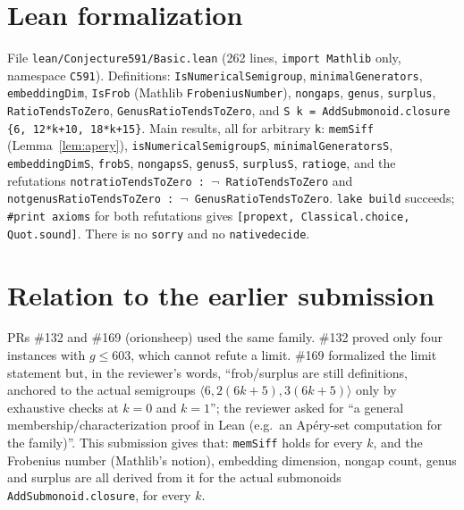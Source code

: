 \documentclass[11pt]{article}
\renewcommand{\_}{\oldus\allowbreak}
\theoremstyle{definition}
\theoremstyle{remark}
\begin{document}
\section{Lean formalization}

File \texttt{lean/Conjecture591/Basic.lean} (262 lines, \texttt{import Mathlib} only, namespace
\texttt{C591}). Definitions: \texttt{IsNumericalSemigroup}, \texttt{minimalGenerators},
\texttt{embeddingDim}, \texttt{IsFrob} (Mathlib \texttt{FrobeniusNumber}), \texttt{nongaps}, \texttt{genus},
\texttt{surplus}, \texttt{RatioTendsToZero}, \texttt{GenusRatioTendsToZero}, and
\texttt{S k = AddSubmonoid.closure \{6, 12*k+10, 18*k+15\}}. Main results, all for arbitrary \texttt{k}:
\texttt{mem\_S\_iff} (Lemma~\ref{lem:apery}), \texttt{isNumericalSemigroup\_S}, \texttt{minimalGenerators\_S},
\texttt{embeddingDim\_S}, \texttt{frob\_S}, \texttt{nongaps\_S}, \texttt{genus\_S}, \texttt{surplus\_S},
\texttt{ratio\_ge}, and the refutations \texttt{not\_ratioTendsToZero : $\neg$ RatioTendsToZero} and
\texttt{not\_genusRatioTendsToZero : $\neg$ GenusRatioTendsToZero}. \texttt{lake build} succeeds;
\texttt{\#print axioms} for both refutations gives \texttt{[propext, Classical.choice, Quot.sound]}. There is
no \texttt{sorry} and no \texttt{native\_decide}.

\section{Relation to the earlier submission}

PRs \#132 and \#169 (orionsheep) used the same family. \#132 proved only four instances with $g\le 603$, which
cannot refute a limit. \#169 formalized the limit statement but, in the reviewer's words, ``frob/surplus are
still definitions, anchored to the actual semigroups $\langle 6, 2(6k+5), 3(6k+5)\rangle$ only by exhaustive
checks at $k = 0$ and $k = 1$''; the reviewer asked for ``a general membership/characterization proof in Lean
(e.g.\ an Ap\'ery-set computation for the family)''. This submission gives that: \texttt{mem\_S\_iff} holds
for every $k$, and the Frobenius number (Mathlib's notion), embedding dimension, nongap count, genus and
surplus are all derived from it for the actual submonoids \texttt{AddSubmonoid.closure}, for every $k$.
\end{document}
